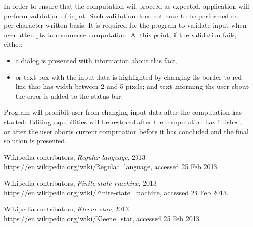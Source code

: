 \documentclass{article}
\begin{document}
In order to ensure that the computation will proceed as expected, application will perform
validation of input. Such validation does not have to be performed on per-character-written basis.
It is required for the program to validate input when user attempts to commence computation. At this
point, if the validation fails, either:

\begin{itemize}

  \item a dialog is presented with information about this fact,

  \item or text box with the input data is highlighted by changing its border to red line that has
  width between 2 and 5 pixels; and text informing the user about the error is added to the status
  bar.

\end{itemize}

Program will prohibit user from changing input data after the computation has started. Editing
capabilities will be restored after the computation has finished, or after the user aborts current
computation before it has concluded and the final solution is presented.

\begin{thebibliography}{9}

  Wikipedia contributors,
  \emph{Regular language},
  2013
  \url{https://en.wikipedia.org/wiki/Regular_language}, accessed 25 Feb 2013.

  Wikipedia contributors,
  \emph{Finite-state machine},
  2013
  \url{https://en.wikipedia.org/wiki/Finite-state_machine}, accessed 23 Feb 2013.

  Wikipedia contributors,
  \emph{Kleene star},
  2013
  \url{https://en.wikipedia.org/wiki/Kleene_star}, accessed 25 Feb 2013.

\end{thebibliography}
\end{document}
